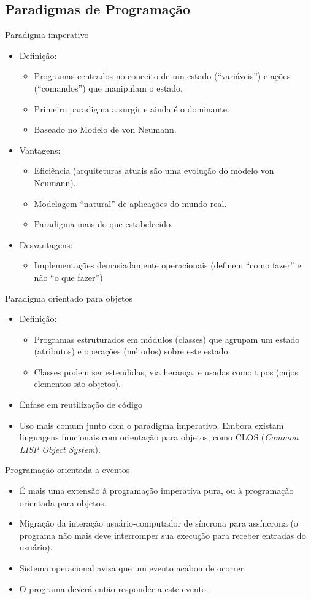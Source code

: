 \documentclass[handout, aspectratio=169]{beamer}
\newcommand{\bi}{\begin{itemize}[<+->]}
\newcommand{\ei}{\end{itemize}}
\begin{document}
\subsection{Paradigmas de Programação}

\begin{frame}{Paradigma imperativo}
    \bi
        \item Definição:
        \bi
            \item Programas centrados no conceito de um estado (``variáveis'') e ações (``comandos'') que manipulam o estado.
            \item Primeiro paradigma a surgir e ainda é o dominante.
            \item Baseado no Modelo de von Neumann.
        \ei
        \item Vantagens:
        \bi
            \item Eficiência (arquiteturas atuais são uma evolução do modelo von Neumann).
            \item Modelagem ``natural'' de aplicações do mundo real.
            \item Paradigma mais do que estabelecido.
        \ei
        \item Desvantagens:
        \bi
            \item Implementações demasiadamente operacionais (definem ``como fazer'' e não ``o que fazer'')
        \ei
    \ei
\end{frame}


\begin{frame}{Paradigma orientado para objetos}
    \bi
        \item Definição:
        \bi
            \item Programas estruturados em módulos (classes) que agrupam um estado (atributos) e operações (métodos) sobre este estado.
            \item Classes podem ser estendidas, via herança, e usadas como tipos (cujos elementos são objetos).
        \ei
        \item Ênfase em reutilização de código
        \item Uso mais comum junto com o paradigma imperativo.
        Embora existam linguagens funcionais com orientação para objetos, como CLOS (\textit{Common LISP Object System}).
    \ei
\end{frame}


\begin{frame}{Programação orientada a eventos}
    \bi
    \item É mais uma extensão à programação imperativa pura, ou à programação orientada para objetos.
    \item Migração da interação usuário-computador de síncrona para assíncrona (o programa não mais deve interromper sua execução para receber entradas do usuário).
    \item Sistema operacional avisa que um evento acabou de ocorrer. \item O programa deverá então responder a este evento.
    \ei
\end{frame}
\end{document}
